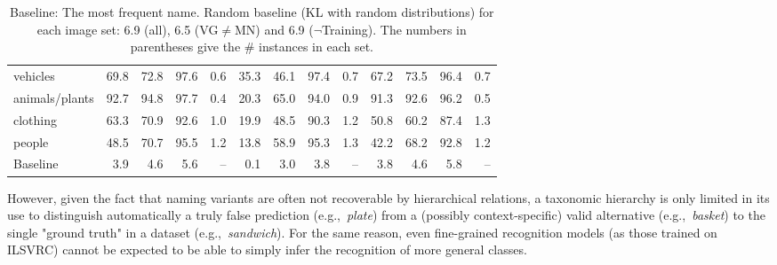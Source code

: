 \begin{table}[t]
\begin{tabular}{l@{~}|@{~}r@{~}r@{~}rr@{~}|@{~}r@{~}r@{~}rr@{~}|@{~}r@{~}r@{~}rr}
		vehicles       &               69.8 &                 72.8 &                   97.6 &            0.6 &            35.3 &              46.1 &                97.4 &         0.7 &             67.2 &               73.5 &                 96.4 &          0.7 \\
		animals/plants &               92.7 &                 94.8 &                   97.7 &            0.4 &            20.3 &              65.0 &                94.0 &         0.9 &             91.3 &               92.6 &                 96.2 &          0.5 \\
		clothing       &               63.3 &                 70.9 &                   92.6 &            1.0 &            19.9 &              48.5 &                90.3 &         1.2 &             50.8 &               60.2 &                 87.4 &          1.3 \\
		people         &               48.5 &                 70.7 &                   95.5 &            1.2 &            13.8 &              58.9 &                95.3 &         1.3 &             42.2 &               68.2 &                 92.8 &          1.2 \\
		\bottomrule
		Baseline       &                3.9 &                  4.6 &                    5.6 &            -- &             0.1 &               3.0 &                 3.8 &         -- &              3.8 &                4.6 &                  5.8 &          -- \\
	\end{tabular}
	\caption{Baseline: The most frequent name. Random baseline (KL with random distributions) for each image set: 6.9 (all), 6.5 (VG$\neq$MN) and 6.9 ($\neg$Training). The numbers in parentheses give the \# instances in each set.	\label{tab:model}}
\end{table}
%
However, given the fact that naming variants are often not recoverable by hierarchical relations, a taxonomic hierarchy is only limited in its use to distinguish automatically a truly false prediction (e.g.,\ \textsl{plate}) from a (possibly context-specific) valid alternative (e.g.,\ \textsl{basket}) to the single "ground truth" in a dataset (e.g.,\ \textsl{sandwich}). 
For the same reason, even fine-grained recognition models (as those trained on ILSVRC) cannot be expected to be able to simply infer the recognition of more general classes.
%

